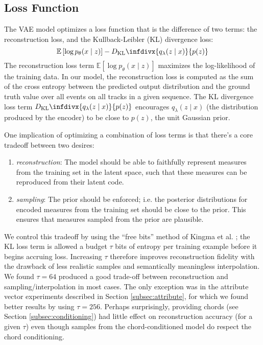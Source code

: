 \documentclass{article}
\begin{document}
\subsection{Loss Function}

The VAE model optimizes a loss function that is the difference of two terms: the reconstruction loss, and the Kullback-Leibler (KL) divergence loss:
\begin{equation}
    \mathbb{E}\left[\log p_\theta(x \mid z) \right] - D_\mathrm{KL}\infdivx{q_\lambda(z \mid x)}{p(z)}
\end{equation}
The reconstruction loss term $\mathbb{E}\left[\log p_\theta(x \mid z) \right]$ maximizes the log-likelihood of the training data.  In our model, the reconstruction loss is computed as the sum of the cross entropy between the predicted output distribution and the ground truth value over all events on all tracks in a given sequence.  The KL divergence loss term \mbox{$D_\mathrm{KL}\infdivx{q_\lambda(z \mid x)}{p(z)}$} encourages $q_\lambda(z \mid x)$ (the distribution produced by the encoder) to be close to $p(z)$, the unit Gaussian prior.

One implication of optimizing a combination of loss terms is that there's a core tradeoff between two desires:
\begin{enumerate}[nolistsep]
    \item {\it reconstruction}: The model should be able to faithfully represent measures from the training set in the latent space, such that these measures can be reproduced from their latent code.
    \item {\it sampling}: The prior should be enforced; i.e. the posterior distributions for encoded measures from the training set should be close to the prior.  This ensures that measures sampled from the prior are plausible.
\end{enumerate}
We control this tradeoff by using the ``free bits'' method of Kingma et al. \cite{kingma2016improved}; the KL loss term is allowed a budget $\tau$ bits of entropy per training example before it begins accruing loss.  Increasing $\tau$ therefore improves reconstruction fidelity with the drawback of less realistic samples and semantically meaningless interpolation.  We found $\tau = 64$ produced a good trade-off between reconstruction and sampling/interpolation in most cases.  The only exception was in the attribute vector experiments described in Section \ref{subsec:attribute}, for which we found better results by using $\tau = 256$.  Perhaps surprisingly, providing chords (see Section \ref{subsec:conditioning}) had little effect on reconstruction accuracy (for a given $\tau$) even though samples from the chord-conditioned model do respect the chord conditioning.
\end{document}

